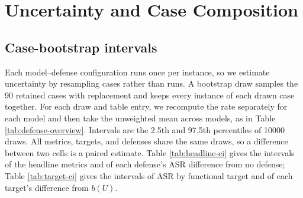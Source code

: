 \section{Uncertainty and Case Composition}
\label{app:uncertainty}

\subsection{Case-bootstrap intervals}

Each model--defense configuration runs once per instance, so we estimate
uncertainty by resampling cases rather than runs. A bootstrap draw samples the
90 retained cases with replacement and keeps every
instance of each drawn case together. For each draw and table entry, we recompute the
rate separately for each model and then take the unweighted mean across models,
as in Table \ref{tab:defense-overview}. Intervals are the 2.5th and 97.5th
percentiles of 10000 draws. All metrics, targets, and defenses
share the same draws, so a difference between two cells is a paired estimate.
Table \ref{tab:headline-ci} gives the intervals of the headline metrics and
of each defense's ASR difference from no defense;
Table \ref{tab:target-ci} gives the intervals of ASR by functional target and
of each target's difference from \(b(U)\).

